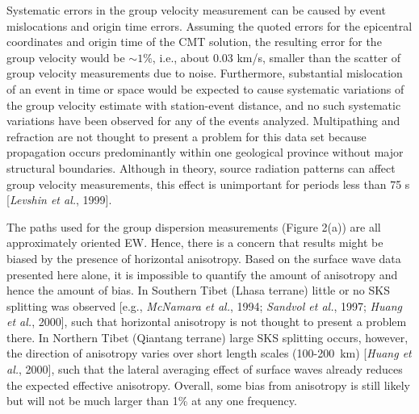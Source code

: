 \documentclass[12pt]{article}
\begin{document}
Systematic errors in the group velocity measurement can be caused by event mislocations and origin time
errors.  Assuming the quoted errors for the epicentral coordinates and origin time of the CMT solution, the
resulting error for the group velocity would be $\sim1\%$, i.e., about 0.03 km/s, smaller than the scatter
of group velocity measurements due to noise.  Furthermore, substantial mislocation of an event in time or
space would be expected to cause systematic variations of the group velocity estimate with station-event
distance, and no such systematic variations have been observed for any of the events analyzed.
Multipathing and refraction are not thought to present a problem for this data set because propagation
occurs predominantly within one geological province without major structural boundaries. Although in
theory, source radiation patterns can affect group velocity measurements, this effect is unimportant for
periods less than 75 s [{\it Levshin et al.}, 1999].

The paths used for the group dispersion measurements (Figure 2(a)) are all
  approximately oriented EW. Hence, there is a concern that results might be
  biased by the presence of horizontal anisotropy.  Based on the surface wave
  data presented here alone, it is impossible to quantify the amount of
  anisotropy and hence the amount of bias.  In Southern Tibet (Lhasa terrane)
little or no  SKS splitting was observed [e.g., {\it McNamara et
    al.}, 1994; {\it Sandvol et    al.}, 1997; {\it Huang et    al.}, 2000],
  such that horizontal anisotropy is not thought to present a problem there.  In
  Northern Tibet (Qiantang terrane) large SKS splitting occurs, however, the direction of
  anisotropy varies over short length scales (100-200~km) [{\it Huang et
    al.}, 2000], such that the lateral averaging effect of surface waves already
  reduces the expected effective anisotropy.  Overall, some bias from anisotropy
  is still likely but will not be much larger than 1\% at any one frequency.
\end{document}
